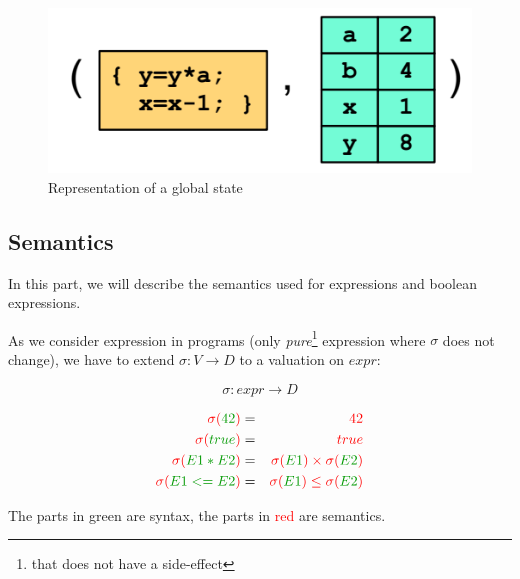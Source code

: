 \documentclass[12pt, a4paper]{book}
\begin{document}
\begin{figure}[!ht]
    \centering
    \includegraphics[width=\linewidth]{global_state.png}
    \caption{Representation of a global state}
\end{figure}

\subsection{Semantics}
\label{sub:Semantics}

In this part, we will describe the semantics used for expressions and boolean
expressions. \newline

As we consider expression in programs (only \textit{pure}\footnote{that does
not have a side-effect} expression where $\sigma$ does not change), we have to
extend $\sigma : V \rightarrow D$ to a valuation on $expr$:

$$
\sigma : expr \rightarrow D
$$

\begin{eqnarray}
    \textcolor{red}{\sigma(}\textcolor{green!60!black}{42}\textcolor{red}{)} & = & \textcolor{red}{42} \\
    \textcolor{red}{\sigma(}\textcolor{green!60!black}{true}\textcolor{red}{)} & = & \textcolor{red}{true} \\
    \textcolor{red}{\sigma(}\textcolor{green!60!black}{E1*E2}\textcolor{red}{)} & = & \textcolor{red}{\sigma(}\textcolor{green!60!black}{E1}\textcolor{red}{) \times \sigma(}\textcolor{green!60!black}{E2}\textcolor{red}{)} \\
    \textcolor{red}{\sigma(}\textcolor{green!60!black}{E1<=E2}\textcolor{red}{)} & = & \textcolor{red}{\sigma(}\textcolor{green!60!black}{E1}\textcolor{red}{) \le \sigma(}\textcolor{green!60!black}{E2}\textcolor{red}{)}
\end{eqnarray}

The parts in \textcolor{green!60!black}{green} are syntax, the parts in
\textcolor{red}{red} are semantics. \newline
\end{document}
